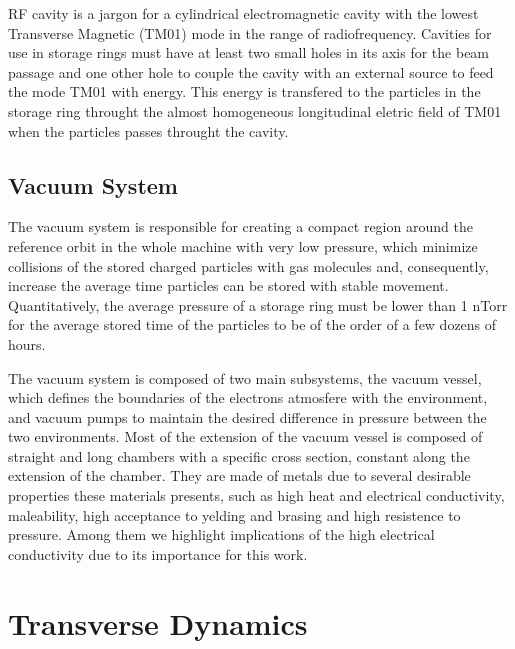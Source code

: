 \documentclass[
	12pt,				%
	openright,			%
	oneside,			%
	a4paper,		%
	chapter=TITLE,		%
	section=TITLE,		%
    brazil,				%
	english,			%
	sumario=tradicional,
	]{abntex2}
\begin{document}
    RF cavity is a jargon for a cylindrical electromagnetic cavity with the lowest Transverse Magnetic (TM01) mode in the range of radiofrequency. Cavities for use in storage rings must have at least two small holes in its axis for the beam passage and one other hole to couple the cavity with an external source to feed the mode TM01 with energy. This energy is transfered to the particles in the storage ring throught the almost homogeneous longitudinal eletric field of TM01 when the particles passes throught the cavity.

    \subsection{Vacuum System}

    The vacuum system is responsible for creating a compact region around the reference orbit in the whole machine with very low pressure, which minimize collisions of the stored charged particles with gas molecules and, consequently, increase the average time particles can be stored with stable movement. Quantitatively, the average pressure of a storage ring must be lower than 1 nTorr for the average stored time of the particles to be of the order of a few dozens of hours.

    The vacuum system is composed of two main subsystems, the vacuum vessel, which defines the boundaries of the electrons atmosfere with the environment, and vacuum pumps to maintain the desired difference in pressure between the two environments. Most of the extension of the vacuum vessel is composed of straight and long chambers with a specific cross section, constant along the extension of the chamber. They are made of metals due to several desirable properties these materials presents, such as high heat and electrical conductivity, maleability, high acceptance to yelding and brasing and high resistence to pressure. Among them we highlight implications of the high electrical conductivity due to its importance for this work.


  \section{Transverse Dynamics}
\end{document}
